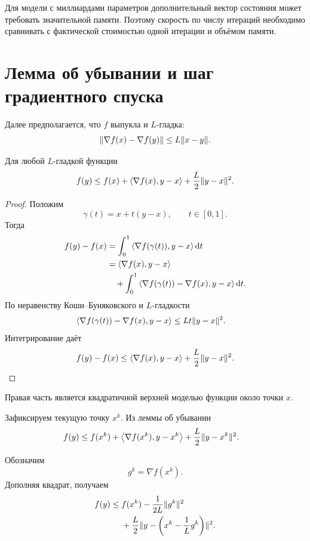 Для модели с миллиардами параметров дополнительный вектор состояния
может требовать значительной памяти. Поэтому скорость по числу
итераций необходимо сравнивать с фактической стоимостью одной
итерации и объёмом памяти.

\section{Лемма об убывании и шаг градиентного спуска}

Далее предполагается, что \(f\) выпукла и \(L\)-гладка:
\[
    \lVert\nabla f(x)-\nabla f(y)\rVert
    \le
    L\lVert x-y\rVert.
\]

\begin{lemma}
Для любой \(L\)-гладкой функции
\[
    f(y)
    \le
    f(x)
    +
    \left\langle \nabla f(x),y-x \right\rangle
    +
    \frac{L}{2}\lVert y-x\rVert^2.
\]
\end{lemma}

\begin{proof}
Положим
\[
    \gamma(t)=x+t(y-x),
    \qquad t\in[0,1].
\]
Тогда
\[
\begin{aligned}
    f(y)-f(x)
    &=
    \int_0^1
    \left\langle 
        \nabla f(\gamma(t))
    ,
        y-x
     \right\rangle
    \mathop{}\!\mathrm{d} t
    \\
    &=
    \left\langle \nabla f(x),y-x \right\rangle
    \\
    &\quad+
    \int_0^1
    \left\langle 
        \nabla f(\gamma(t))-\nabla f(x)
    ,
        y-x
     \right\rangle
    \mathop{}\!\mathrm{d} t.
\end{aligned}
\]
По неравенству Коши--Буняковского и \(L\)-гладкости
\[
\begin{aligned}
    \left\langle 
        \nabla f(\gamma(t))-\nabla f(x)
    ,
        y-x
     \right\rangle
    &\le
    Lt\lVert y-x\rVert^2.
\end{aligned}
\]
Интегрирование даёт
\[
    f(y)-f(x)
    \le
    \left\langle \nabla f(x),y-x \right\rangle
    +
    \frac{L}{2}\lVert y-x\rVert^2.
\]
\end{proof}

Правая часть является квадратичной верхней моделью функции около
точки \(x\).



Зафиксируем текущую точку \(x^k\). Из леммы об убывании
\[
\begin{aligned}
    f(y)
    \le{}&
    f(x^k)
    +
    \left\langle \nabla f(x^k),y-x^k \right\rangle
    +
    \frac{L}{2}\lVert y-x^k\rVert^2.
\end{aligned}
\]

Обозначим
\[
    g^k=\nabla f(x^k).
\]
Дополняя квадрат, получаем
\[
\begin{aligned}
    f(y)
    \le{}&
    f(x^k)
    -
    \frac{1}{2L}\lVert g^k\rVert^2
    \\
    &+
    \frac{L}{2}
    \lVert
        y-
        \left(
            x^k-\frac1L g^k
        \right)
    \rVert^2.
\end{aligned}
\]

